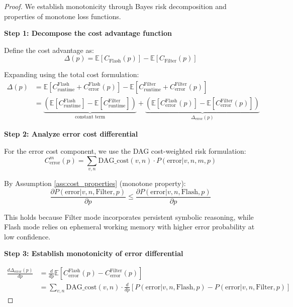 \documentclass[11pt]{article}
\theoremstyle{definition}
\begin{document}
\begin{proof}
We establish monotonicity through Bayes risk decomposition and properties of monotone loss functions.

\textbf{Step 1: Decompose the cost advantage function}

Define the cost advantage as:
\begin{equation}
\Delta(p) = \mathbb{E}[C_{\text{Flash}}(p)] - \mathbb{E}[C_{\text{Filter}}(p)]
\end{equation}

Expanding using the total cost formulation:
\begin{align}
\Delta(p) &= \mathbb{E}[C_{\text{runtime}}^{\text{Flash}} + C_{\text{error}}^{\text{Flash}}(p)] - \mathbb{E}[C_{\text{runtime}}^{\text{Filter}} + C_{\text{error}}^{\text{Filter}}(p)] \\
&= \underbrace{(\mathbb{E}[C_{\text{runtime}}^{\text{Flash}}] - \mathbb{E}[C_{\text{runtime}}^{\text{Filter}}])}_{\text{constant term}} + \underbrace{(\mathbb{E}[C_{\text{error}}^{\text{Flash}}(p)] - \mathbb{E}[C_{\text{error}}^{\text{Filter}}(p)])}_{\Delta_{\text{error}}(p)}
\end{align}

\textbf{Step 2: Analyze error cost differential}

For the error cost component, we use the DAG cost-weighted risk formulation:
\begin{equation}
C_{\text{error}}^m(p) = \sum_{v,n} \text{DAG\_cost}(v,n) \cdot P(\text{error} | v,n,m,p)
\end{equation}

By Assumption \ref{ass:cost_properties} (monotone property):
\begin{equation}
\frac{\partial P(\text{error} | v,n,\text{Filter},p)}{\partial p} \leq \frac{\partial P(\text{error} | v,n,\text{Flash},p)}{\partial p}
\end{equation}

This holds because Filter mode incorporates persistent symbolic reasoning, while Flash mode relies on ephemeral working memory with higher error probability at low confidence.

\textbf{Step 3: Establish monotonicity of error differential}

\begin{align}
\frac{d\Delta_{\text{error}}(p)}{dp} &= \frac{d}{dp}\mathbb{E}[C_{\text{error}}^{\text{Flash}}(p) - C_{\text{error}}^{\text{Filter}}(p)] \\
&= \sum_{v,n} \text{DAG\_cost}(v,n) \cdot \frac{d}{dp}[P(\text{error} | v,n,\text{Flash},p) - P(\text{error} | v,n,\text{Filter},p)]
\end{align}


\end{proof}
\end{document}

